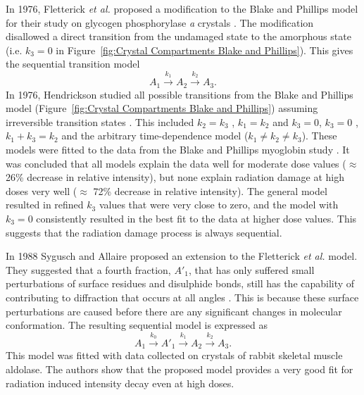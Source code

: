         In 1976, Fletterick \textit{et al.} proposed a modification to the Blake and Phillips model for their study on  glycogen phosphorylase \textit{a} crystals \cite{fletterick1976low}.
        The modification disallowed a direct transition from the undamaged state to the amorphous state (i.e. $k_3 = 0$ in Figure~\ref{fig:Crystal Compartments Blake and Phillips}). This gives the sequential transition model
        \begin{equation}
            A_1 \xrightarrow{k_1} A_2 \xrightarrow{k_2} A_3.
        \end{equation}
        In 1976, Hendrickson studied all possible transitions from the Blake and Phillips model (Figure~\ref{fig:Crystal Compartments Blake and Phillips}) assuming irreversible transition states \cite{hendrickson1976}.
        This included $k_2 = k_3$ \cite{hendrickson1973}, $k_1 = k_2$ and $k_3 = 0$, $k_3 = 0$ \cite{fletterick1976low}, $k_1 + k_3 = k_2$ and the arbitrary time-dependence model ($k_1 \neq k_2 \neq k_3$).
        These models were fitted to the data from the Blake and Phillips myoglobin study \cite{blake1962}.
        It was concluded that all models explain the data well for moderate dose values ($\approx$ 26\% decrease in relative intensity), but none explain radiation damage at high doses very well ($\approx$ 72\% decrease in relative intensity).
        The general model resulted in refined $k_3$ values that were very close to zero, and the model with $k_3 = 0$ consistently resulted in the best fit to the data at higher dose values.
        This suggests that the radiation damage process is always sequential.

		In 1988 Sygusch and Allaire proposed an extension to the Fletterick \textit{et al.} model.
        They suggested that a fourth fraction, $A'_1$, that has only suffered small perturbations of surface residues and disulphide bonds, still has the capability of contributing to diffraction that occurs at all angles \cite{sygusch1988}.
        This is because these surface perturbations are caused before there are any significant changes in molecular conformation.
        The resulting sequential model is expressed as
        \begin{equation}
            A_1 \xrightarrow{k_0} A'_1 \xrightarrow{k_1} A_2 \xrightarrow{k_2} A_3.
        \end{equation}
        This model was fitted with data collected on crystals of rabbit skeletal muscle aldolase. The authors show that the proposed model provides a very good fit for radiation induced intensity decay even at high doses.

